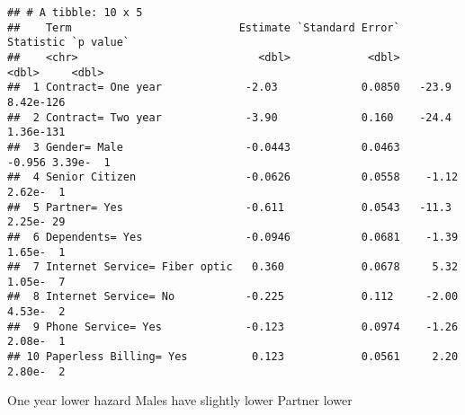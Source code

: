 \documentclass[
]{article}
\begin{document}
\begin{verbatim}
## # A tibble: 10 x 5
##    Term                          Estimate `Standard Error` Statistic `p value`
##    <chr>                            <dbl>            <dbl>     <dbl>     <dbl>
##  1 Contract= One year             -2.03             0.0850   -23.9   8.42e-126
##  2 Contract= Two year             -3.90             0.160    -24.4   1.36e-131
##  3 Gender= Male                   -0.0443           0.0463    -0.956 3.39e-  1
##  4 Senior Citizen                 -0.0626           0.0558    -1.12  2.62e-  1
##  5 Partner= Yes                   -0.611            0.0543   -11.3   2.25e- 29
##  6 Dependents= Yes                -0.0946           0.0681    -1.39  1.65e-  1
##  7 Internet Service= Fiber optic   0.360            0.0678     5.32  1.05e-  7
##  8 Internet Service= No           -0.225            0.112     -2.00  4.53e-  2
##  9 Phone Service= Yes             -0.123            0.0974    -1.26  2.08e-  1
## 10 Paperless Billing= Yes          0.123            0.0561     2.20  2.80e-  2
\end{verbatim}

One year lower hazard Males have slightly lower Partner lower
\end{document}
